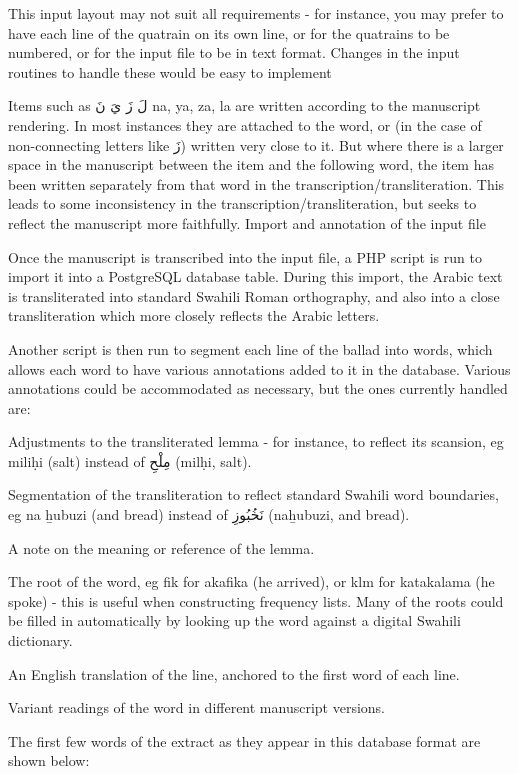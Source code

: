 \documentclass[a4paper,10pt]{article}
\begin{document}
This input layout may not suit all requirements - for instance, you may prefer to have each line of the quatrain on its own line, or for the quatrains to be numbered, or for the input file to be in text format. Changes in the input routines to handle these would be easy to implement

Items such as لَ زَ يَ نَ na, ya, za, la are written according to the manuscript rendering. In most instances they are attached to the word, or (in the case of non-connecting letters like زَ) written very close to it. But where there is a larger space in the manuscript between the item and the following word, the item has been written separately from that word in the transcription/transliteration. This leads to some inconsistency in the transcription/transliteration, but seeks to reflect the manuscript more faithfully.
Import and annotation of the input file

Once the manuscript is transcribed into the input file, a PHP script is run to import it into a PostgreSQL database table. During this import, the Arabic text is transliterated into standard Swahili Roman orthography, and also into a close transliteration which more closely reflects the Arabic letters.

Another script is then run to segment each line of the ballad into words, which allows each word to have various annotations added to it in the database. Various annotations could be accommodated as necessary, but the ones currently handled are:

Adjustments to the transliterated lemma - for instance, to reflect its scansion, eg miliḥi (salt) instead of مِلْحِ (milḥi, salt).

Segmentation of the transliteration to reflect standard Swahili word boundaries, eg na ẖubuzi (and bread) instead of نَخُبُوزِ (naẖubuzi, and bread).

A note on the meaning or reference of the lemma.

The root of the word, eg fik for akafika (he arrived), or klm for katakalama (he spoke) - this is useful when constructing frequency lists. Many of the roots could be filled in automatically by looking up the word against a digital Swahili dictionary.

An English translation of the line, anchored to the first word of each line.

Variant readings of the word in different manuscript versions.

The first few words of the extract as they appear in this database format are shown below:
\end{document}
